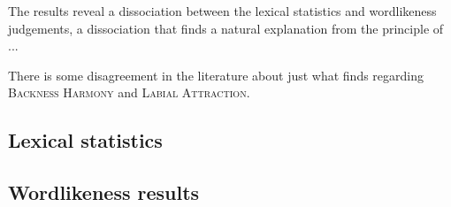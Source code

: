 
The results reveal a dissociation between the lexical statistics and wordlikeness judgements, a dissociation that finds a natural explanation from the principle of ...

There is some disagreement in the literature about just what \citet{Zimmer1969} finds regarding \textsc{Backness Harmony} and \textsc{Labial Attraction}.

\subsection{Lexical statistics}   
\subsection{Wordlikeness results} 
